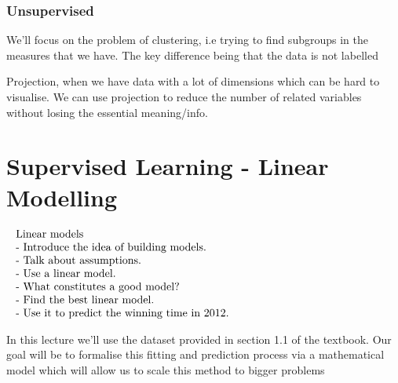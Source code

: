 
	\subsubsection{Unsupervised}


		\par{We'll focus on the problem of clustering, i.e trying to find subgroups in the measures that we have. The key difference being that the data is not labelled}



		\par{Projection, when we have data with a lot of dimensions which can be hard to visualise. We can use projection to reduce the number of related variables without losing the essential meaning/info.}



\section{Supervised Learning - Linear Modelling}


	$\begin{array}{l}\text { Linear models } \\ \text { - Introduce the idea of building models. } \\ \text { - Talk about assumptions. } \\ \text { - Use a linear model. } \\ \text { - What constitutes a good model? } \\ \text { - Find the best linear model. } \\ \text { - Use it to predict the winning time in 2012. }\end{array}\\$

	\par{In this lecture we'll use the dataset provided in section 1.1 of the textbook. Our goal will be to formalise this fitting and prediction process via a mathematical model which will allow us to scale this method to bigger problems}


